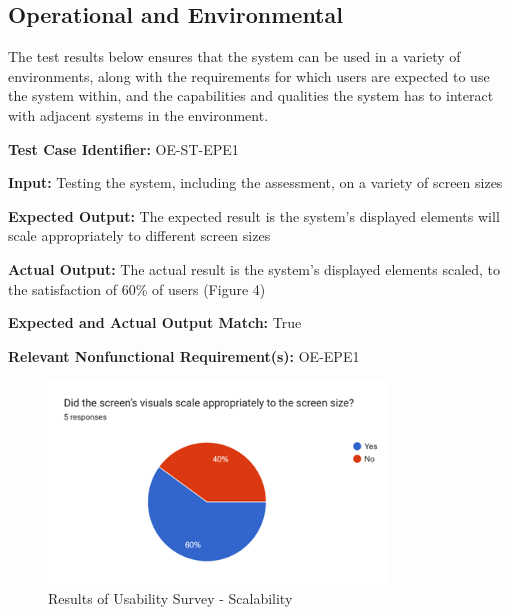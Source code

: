 \documentclass[12pt, titlepage]{article}
\begin{document}
\subsection{Operational and Environmental}
\hspace{2em}The test results below ensures that the system can be used in a variety of environments,
along with the requirements for which users are expected to use the system within, and the
capabilities and qualities the system has to interact with adjacent systems in the environment.

\begin{mdframed}[linewidth=0.5mm] \par
  \textbf{Test Case Identifier:} OE-ST-EPE1 \par
  \textbf{Input:} Testing the system, including the assessment, on a variety of screen sizes \par
  \textbf{Expected Output:} The expected result is the system's displayed elements will scale appropriately to different screen sizes \par
  \textbf{Actual Output:} The actual result is the system's displayed elements scaled, to the satisfaction of 60\% of users (Figure 4)\par
  \textbf{Expected and Actual Output Match:} True \par
  \textbf{Relevant Nonfunctional Requirement(s):} OE-EPE1
\end{mdframed}

\begin{figure}[h]
  \centering
  \includegraphics[width=0.8\textwidth]{images/UsabilityTestResults2.png}
  \caption{Results of Usability Survey - Scalability}
\end{figure}
\end{document}
